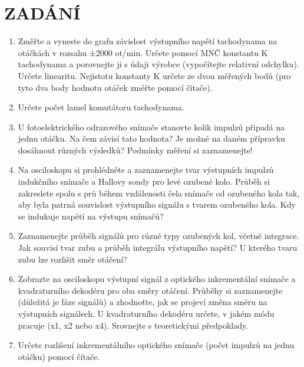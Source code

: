 \documentclass{protokol}
\begin{document}
\section{ZADÁNÍ}\label{kap:zadani}
    \begin{enumerate}
        \item   Změřte a vyneste do grafu závislost výstupního napětí tachodynama na otáčkách
                v rozsahu ±2000 ot/min. Určete pomocí MNČ konstantu K tachodynama a porovnejte ji s údaji výrobce (vypočítejte relativní odchylku). Určete linearitu. Nejistotu
                konstanty K určete ze dvou měřených bodů (pro tyto dva body hodnotu otáček
                změřte pomocí čítače).

        \item   Určete počet lamel komutátoru tachodynama.
                
        \item   U fotoelektrického odrazového snímače stanovte kolik impulzů připadá na jednu
                otáčku. Na čem závisí tato hodnota? Je možné na daném přípravku dosáhnout
                různých výsledků? Podmínky měření si zaznamenejte!
        
        \item   Na osciloskopu si prohlédněte a zaznamenejte tvar výstupních impulzů indukčního
                snímače a Hallovy sondy pro levé ozubené kolo. Průběh si zakreslete spolu s prů
                během vzdálenosti čela snímače od ozubeného kola tak, aby byla patrná souvislost
                výstupního signálu s tvarem ozubeného kola. Kdy se indukuje napětí na výstupu
                snímačů?

        \item   Zaznamenejte průběh signálů pro různé typy ozubených kol, včetně integrace. Jak
                souvisí tvar zubu a průběh integrálu výstupního napětí? U kterého tvaru zubu lze
                rozlišit směr otáčení?

        \item   Zobrazte na osciloskopu výstupní signál z optického inkrementální snímače a kvadraturního dekodéru pro oba směry otáčení. Průběhy si zaznamenejte (důležitá je
                fáze signálů) a zhodnoťte, jak se projeví změna směru na výstupních signálech. U
                kvadraturního dekodéru určete, v jakém módu pracuje (x1, x2 nebo x4). Srovnejte
                s teoretickými předpoklady.
                
        \item   Určete rozlišení inkrementálního optického snímače (počet impulzů na jednu otáčku)
                pomocí čítače.
                

\end{enumerate}
\end{document}
